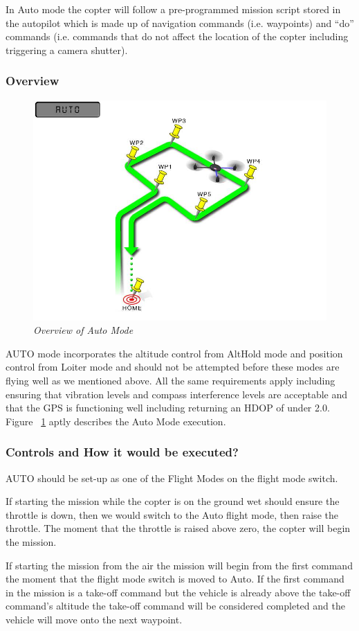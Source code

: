 In Auto mode the copter will follow a pre-programmed mission script stored in the autopilot which is made up of navigation commands (i.e. waypoints) and “do” commands (i.e. commands that do not affect the location of the copter including triggering a camera shutter). 
\subsubsection{Overview}
\begin{figure}[h]
	\includegraphics[width=0.7\linewidth]{auto}
	\centering
	\caption{\label{fig: auto}\textit{Overview of Auto Mode}}
\end{figure}
AUTO mode incorporates the altitude control from AltHold mode and position control from Loiter mode and should not be attempted before these modes are flying well as we mentioned above. All the same requirements apply including ensuring that vibration levels and compass interference levels are acceptable and that the GPS is functioning well including returning an HDOP of under 2.0. Figure ~\ref{fig: auto} aptly describes the Auto Mode execution.



\subsubsection{Controls and How it would be executed?}
AUTO should be set-up as one of the Flight Modes on the flight mode switch.

If starting the mission while the copter is on the ground wet should ensure the throttle is down, then we would switch to the Auto flight mode, then raise the throttle. The moment that the throttle is raised above zero, the copter will begin the mission.

If starting the mission from the air the mission will begin from the first command the moment that the flight mode switch is moved to Auto. If the first command in the mission is a take-off command but the vehicle is already above the take-off command’s altitude the take-off command will be considered completed and the vehicle will move onto the next waypoint.

